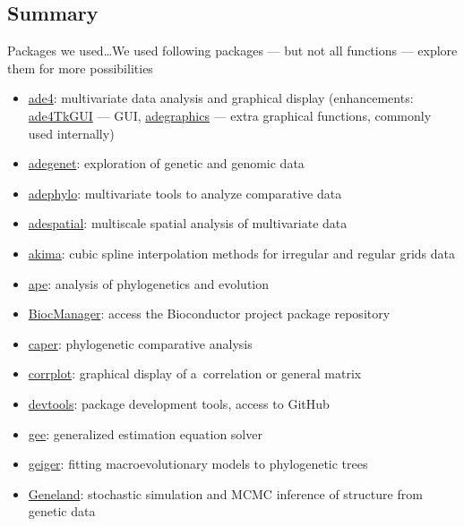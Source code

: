 \documentclass[compress, xelatex, 11pt, xcolor=svgnames, aspectratio=169, url={hyphens, lowtilde}]{beamer}
\begin{document}
\subsection{Summary}

\begin{frame}[allowframebreaks]{Packages we used\ldots}{We used following packages --- but not all functions --- explore them for more possibilities}
	\begin{itemize}
		\item \href{https://CRAN.R-project.org/package=ade4}{ade4}: multivariate data analysis and graphical display (enhancements: \href{https://CRAN.R-project.org/package=ade4TkGUI}{ade4TkGUI} --- GUI, \href{https://CRAN.R-project.org/package=adegraphics}{adegraphics} --- extra graphical functions, commonly used internally)
		\item \href{https://CRAN.R-project.org/package=adegenet}{adegenet}: exploration of genetic and genomic data
		\item \href{https://CRAN.R-project.org/package=adephylo}{adephylo}: multivariate tools to analyze comparative data
		\item \href{https://CRAN.R-project.org/package=adespatial}{adespatial}: multiscale spatial analysis of multivariate data
		\item \href{https://CRAN.R-project.org/package=akima}{akima}: cubic spline interpolation methods for irregular and regular grids data
		\item \href{https://CRAN.R-project.org/package=ape}{ape}: analysis of phylogenetics and evolution
		\item \href{https://CRAN.R-project.org/package=BiocManager}{BiocManager}: access the Bioconductor project package repository
		\item \href{https://CRAN.R-project.org/package=caper}{caper}: phylogenetic comparative analysis
		\item \href{https://CRAN.R-project.org/package=corrplot}{corrplot}: graphical display of a~correlation or general matrix
		\item \href{https://CRAN.R-project.org/package=devtools}{devtools}: package development tools, access to GitHub
		\item \href{https://CRAN.R-project.org/package=gee}{gee}: generalized estimation equation solver
		\item \href{https://CRAN.R-project.org/package=geiger}{geiger}: fitting macroevolutionary models to phylogenetic trees
		\item \href{https://github.com/gilles-guillot/Geneland}{Geneland}: stochastic simulation and MCMC inference of structure from genetic data

\end{itemize}
\end{frame}
\end{document}
